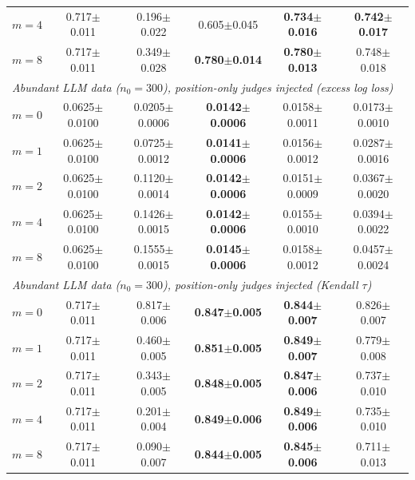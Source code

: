 \begin{table}[!t]
{\begin{tabular}{lccccc}
\quad $m=4$ & 0.717{\scriptsize$\pm$0.011} & 0.196{\scriptsize$\pm$0.022} & 0.605{\scriptsize$\pm$0.045} & \textbf{0.734{\scriptsize$\pm$0.016}} & \textbf{0.742{\scriptsize$\pm$0.017}} \\
\quad $m=8$ & 0.717{\scriptsize$\pm$0.011} & 0.349{\scriptsize$\pm$0.028} & \textbf{0.780{\scriptsize$\pm$0.014}} & \textbf{0.780{\scriptsize$\pm$0.013}} & 0.748{\scriptsize$\pm$0.018} \\
\midrule
\multicolumn{6}{l}{\emph{Abundant LLM data ($n_0=300$), position-only judges injected (excess log loss)}} \\
\quad $m=0$ & 0.0625{\scriptsize$\pm$0.0100} & 0.0205{\scriptsize$\pm$0.0006} & \textbf{0.0142{\scriptsize$\pm$0.0006}} & 0.0158{\scriptsize$\pm$0.0011} & 0.0173{\scriptsize$\pm$0.0010} \\
\quad $m=1$ & 0.0625{\scriptsize$\pm$0.0100} & 0.0725{\scriptsize$\pm$0.0012} & \textbf{0.0141{\scriptsize$\pm$0.0006}} & 0.0156{\scriptsize$\pm$0.0012} & 0.0287{\scriptsize$\pm$0.0016} \\
\quad $m=2$ & 0.0625{\scriptsize$\pm$0.0100} & 0.1120{\scriptsize$\pm$0.0014} & \textbf{0.0142{\scriptsize$\pm$0.0006}} & 0.0151{\scriptsize$\pm$0.0009} & 0.0367{\scriptsize$\pm$0.0020} \\
\quad $m=4$ & 0.0625{\scriptsize$\pm$0.0100} & 0.1426{\scriptsize$\pm$0.0015} & \textbf{0.0142{\scriptsize$\pm$0.0006}} & 0.0155{\scriptsize$\pm$0.0010} & 0.0394{\scriptsize$\pm$0.0022} \\
\quad $m=8$ & 0.0625{\scriptsize$\pm$0.0100} & 0.1555{\scriptsize$\pm$0.0015} & \textbf{0.0145{\scriptsize$\pm$0.0006}} & 0.0158{\scriptsize$\pm$0.0012} & 0.0457{\scriptsize$\pm$0.0024} \\
\midrule
\multicolumn{6}{l}{\emph{Abundant LLM data ($n_0=300$), position-only judges injected (Kendall $\tau$)}} \\
\quad $m=0$ & 0.717{\scriptsize$\pm$0.011} & 0.817{\scriptsize$\pm$0.006} & \textbf{0.847{\scriptsize$\pm$0.005}} & \textbf{0.844{\scriptsize$\pm$0.007}} & 0.826{\scriptsize$\pm$0.007} \\
\quad $m=1$ & 0.717{\scriptsize$\pm$0.011} & 0.460{\scriptsize$\pm$0.005} & \textbf{0.851{\scriptsize$\pm$0.005}} & \textbf{0.849{\scriptsize$\pm$0.007}} & 0.779{\scriptsize$\pm$0.008} \\
\quad $m=2$ & 0.717{\scriptsize$\pm$0.011} & 0.343{\scriptsize$\pm$0.005} & \textbf{0.848{\scriptsize$\pm$0.005}} & \textbf{0.847{\scriptsize$\pm$0.006}} & 0.737{\scriptsize$\pm$0.010} \\
\quad $m=4$ & 0.717{\scriptsize$\pm$0.011} & 0.201{\scriptsize$\pm$0.004} & \textbf{0.849{\scriptsize$\pm$0.006}} & \textbf{0.849{\scriptsize$\pm$0.006}} & 0.735{\scriptsize$\pm$0.010} \\
\quad $m=8$ & 0.717{\scriptsize$\pm$0.011} & 0.090{\scriptsize$\pm$0.007} & \textbf{0.844{\scriptsize$\pm$0.005}} & \textbf{0.845{\scriptsize$\pm$0.006}} & 0.711{\scriptsize$\pm$0.013} \\
\bottomrule
\end{tabular}}
\end{table}
